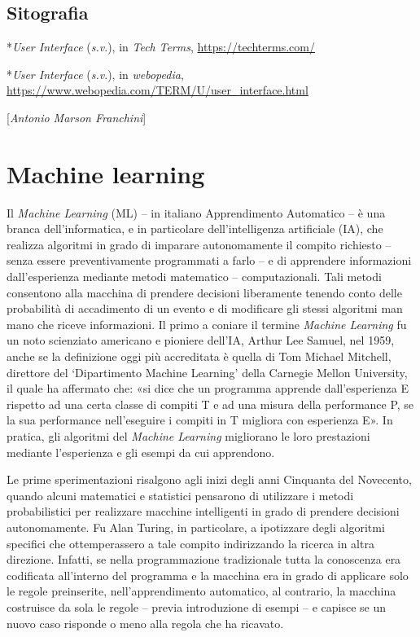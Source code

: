 {{\section*{Sitografia}
{\parindent0pt 
*\emph{User Interface} (\emph{s.v}.), in \emph{Tech} \emph{Terms},
\url{https://techterms.com/}

*\emph{User Interface} (\emph{s.v}.), in \emph{webopedia},
\url{https://www.webopedia.com/TERM/U/user_interface.html}

}

\hrulefill 

{[}\emph{Antonio Marson Franchini}{]}



\chapter{Machine learning}

Il \emph{Machine Learning} (ML) -- in italiano Apprendimento Automatico
-- è una branca dell'informatica, e in particolare dell'intelligenza
artificiale (IA), che realizza algoritmi in grado di imparare
autonomamente il compito richiesto -- senza essere preventivamente
programmati a farlo -- e di apprendere informazioni dall'esperienza
mediante metodi matematico -- computazionali. Tali metodi consentono
alla macchina di prendere decisioni liberamente tenendo conto delle
probabilità di accadimento di un evento e di modificare gli stessi
algoritmi man mano che riceve informazioni. Il primo a coniare il
termine \emph{Machine Learning} fu un noto scienziato americano e
pioniere dell'IA, Arthur Lee Samuel, nel 1959, anche se la definizione
oggi più accreditata è quella di Tom Michael Mitchell, direttore del
`Dipartimento Machine Learning' della Carnegie Mellon University, il
quale ha affermato che: «si dice che un programma apprende
dall'esperienza E rispetto ad una certa classe di compiti T e ad una
misura della performance P, se la sua performance nell'eseguire i
compiti in T migliora con esperienza E». In pratica, gli algoritmi del
\emph{Machine Learning} migliorano le loro prestazioni mediante
l'esperienza e gli esempi da cui apprendono.~

Le prime sperimentazioni risalgono agli inizi degli anni Cinquanta del
Novecento, quando alcuni matematici e statistici pensarono di utilizzare
i metodi probabilistici per realizzare macchine intelligenti in grado di
prendere decisioni autonomamente. Fu Alan Turing, in particolare, a
ipotizzare degli algoritmi specifici che ottemperassero a tale compito
indirizzando la ricerca in altra direzione. Infatti, se nella
programmazione tradizionale tutta la conoscenza era codificata
all'interno del programma e la macchina era in grado di applicare solo
le regole preinserite, nell'apprendimento automatico, al contrario, la
macchina costruisce da sola le regole -- previa introduzione di esempi
-- e capisce se un nuovo caso risponde o meno alla regola che ha
ricavato.

}}
